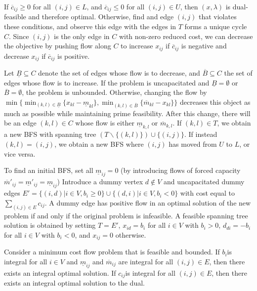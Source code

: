 \begin{thm}
  \label{sec:graphs-flows-6}
  If $\overline c_{ij} \geq 0$  for all $(i, j) \in L$, and $\overline
  c_{ij} \leq 0$ for all $(i, j)\in U$, then $(x, \lambda)$ is
  dual-feasible and therefore optimal. Otherwise, find and edge $(i,
  j)$ that violates these conditions, and observe this edge with the
  edges in $T$ forms a unique cycle $C$.  Since $(i, j)$ is the only
  edge in $C$ with non-zero reduced cost, we can decrease the
  objective by pushing flow along $C$ to increase $x_{ij}$ if
  $\overline c_{ij}$ is negative and decrease $x_{ij}$ if $\overline
  c_{ij}$ is positive.

  Let $\underline B \subseteq C$ denote the set of edges whose flow is
  to decrease, and $\overline B \subseteq C$ the set of edges whose
  flow is to increase. If the problem is uncapacitated and $\underline
  B = \emptyset$ or $\overline B = \emptyset$, the problem is
  unbounded. Otherwise, changing the flow by $\min \{ \min_{(k, l) \in
    \underline B} \{ x_{kl} - \underline m_{kl} \}, \min_{(k, l) \in
    \overline B} \{ \overline m_{kl} - x_{kl} \} \} $ decreases this
  object as much as possible while maintaining prime feasibility.
  After this change, there will be an edge $(k, l) \in C$ whose flow
  is either $\underline m_{k,l}$ or $\overline m_{k,l}$. If $(k, l)
  \in T$, we obtain a new BFS with spanning tree $(T \backslash \{ (k,
  l) \}) \cup \{ (i, j) \}$. If instead $(k, l) = (i, j)$, we obtain a
  new BFS where $(i, j)$ has moved from $U$ to $L$, or vice versa.

  To find an initial BFS, set all $\underline m_{ij} = 0$ (by
  introducing flows of forced capacity $\overline m'_{ij} = \underline
  m'_{ij} = \underline m_{ij}$) Introduce a dummy vertex $d \notin V$
  and uncapacitated dummy edges $E' = \{ (i, d) | i \in V, b_{i} \geq
  0 \} \cup \{ (d, i) | i \in V, b_{i} < 0\} $ with cost equal to
  $\sum_{(i, j) \in E}^{} c_{ij}$. A dummy edge has positive flow in
  an optimal solution of the new problem if and only if the original
  problem is infeasible. A feasible spanning tree solution is obtained
  by setting $T = E'$, $x_{id} = b_{i}$ for all $i \in V$ with $b_{i}
  > 0$, $d_{di} = -b_{i}$ for all $i \in V$ with $b_{i} < 0$, and
  $x_{ij} = 0$ otherwise.
\end{thm}

\begin{thm}
  \label{sec:graphs-flows-5}
  Consider a minimum cost flow problem that is feasible and bounded.
  If $b_{i}$is integral for all $i \in V$ and $\underline m_{ij}$ and
  $\overline m_{ij}$ are integral for all $(i, j) \in E$, then there
  exists an integral optimal solution.  If $c_{ij}$is integral for all
  $(i, j)\in E$, then there exists an integral optimal solution to the dual.
\end{thm}


